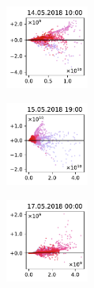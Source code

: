 \begin{figure}[H]
    \centering
    \begin{subfigure}
        \centering
        \includegraphics[width=0.30\textwidth,valign=t]{evaluation/figures/perturbations/perturbation-14.05.2018:10.00-biogenic-div-1.5.pdf}
    \end{subfigure}
    \begin{subfigure}
        \centering
        \includegraphics[width=0.30\textwidth,valign=t]{evaluation/figures/perturbations/perturbation-15.05.2018:19.00-biogenic-div-1.5.pdf}
    \end{subfigure}
    \begin{subfigure}
        \centering
        \includegraphics[width=0.30\textwidth,valign=t]{evaluation/figures/perturbations/perturbation-17.05.2018:00.00-biogenic-div-1.5.pdf}
    \end{subfigure}


\end{figure}
